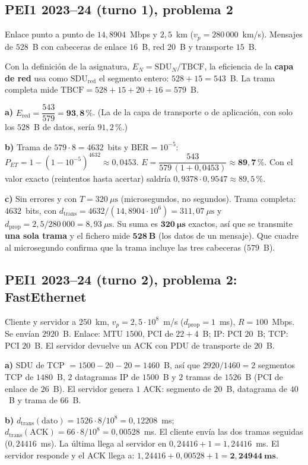 \documentclass[11pt,a4paper]{article}
\begin{document}
\subsection*{PEI1 2023--24 (turno 1), problema 2}
Enlace punto a punto de $14{,}8904$~Mbps y $2{,}5$~km ($v_p=280\,000$~km/s). Mensajes de $528$~B con cabeceras de enlace $16$~B, red $20$~B y transporte $15$~B.

Con la definición de la asignatura, $E_N=\text{SDU}_N/\text{TBCF}$, la eficiencia de la \textbf{capa de red} usa como $\text{SDU}_{\text{red}}$ el segmento entero: $528+15=543$~B. La trama completa mide $\text{TBCF}=528+15+20+16=579$~B.

\textbf{a)} $E_{\text{red}}=\dfrac{543}{579}=\mathbf{93{,}8\,\%}$. (La de la capa de transporte o de aplicación, con solo los $528$~B de datos, sería $91{,}2\,\%$.)

\textbf{b)} Trama de $579\cdot8=4632$~bits y $\text{BER}=10^{-5}$: $P_{ET}=1-(1-10^{-5})^{4632}\approx0{,}0453$. $E=\dfrac{543}{579\,(1+0{,}0453)}\approx\mathbf{89{,}7\,\%}$. Con el valor exacto (reintentos hasta acertar) saldría $0{,}9378\cdot0{,}9547\approx89{,}5\,\%$.

\textbf{c)} Sin errores y con $T=320~\mu\text{s}$ (microsegundos, no segundos). Trama completa: $4632$~bits, con $d_{\text{trans}}=4632/(14{,}8904\cdot10^{6})=311{,}07~\mu\text{s}$ y $d_{\text{prop}}=2{,}5/280\,000=8{,}93~\mu\text{s}$. Su suma es $\mathbf{320~\mu s}$ exactos, así que se transmite \textbf{una sola trama} y el fichero mide $\mathbf{528~B}$ (los datos de un mensaje). Que cuadre al microsegundo confirma que la trama incluye las tres cabeceras ($579$~B).

\subsection*{PEI1 2023--24 (turno 2), problema 2: FastEthernet}
Cliente y servidor a $250$~km, $v_p=2{,}5\cdot10^{8}$~m/s ($d_{\text{prop}}=1$~ms), $R=100$~Mbps. Se envían $2920$~B. Enlace: MTU $1500$, PCI de $22+4$~B; IP: PCI $20$~B; TCP: PCI $20$~B. El servidor devuelve un ACK con PDU de transporte de $20$~B.

\textbf{a)} SDU de TCP $=1500-20-20=1460$~B, así que $2920/1460=2$ segmentos TCP de $1480$~B, $2$ datagramas IP de $1500$~B y $2$ tramas de $1526$~B (PCI de enlace de $26$~B). El servidor genera $1$ ACK: segmento de $20$~B, datagrama de $40$~B y trama de $66$~B.

\textbf{b)} $d_{\text{trans}}(\text{dato})=1526\cdot8/10^{8}=0{,}12208$~ms; $d_{\text{trans}}(\text{ACK})=66\cdot8/10^{8}=0{,}00528$~ms. El cliente envía las dos tramas seguidas ($0{,}24416$~ms). La última llega al servidor en $0{,}24416+1=1{,}24416$~ms. El servidor responde y el ACK llega a: $1{,}24416+0{,}00528+1=\mathbf{2{,}24944~ms}$.
\end{document}
